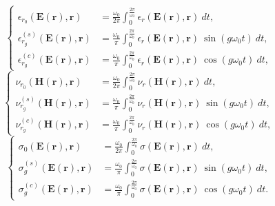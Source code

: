 \begin{equation}
\left\{
\begin{aligned} \label{eq:epsCoeffs}
{\epsilon}_{r_{0}}(\mathbf{E}(\mathbf{r}),\mathbf{r}) &= \frac{\omega_0}{2\pi}\int_0^{\frac{2\pi}{\omega_0}}
{\epsilon}_r(\mathbf{E}(\mathbf{r}),\mathbf{r}) \ dt, \\[.5cm]
{\epsilon}_{r_{g}}^{(s)}(\mathbf{E}(\mathbf{r}),\mathbf{r}) &=  \frac{\omega_0}{\pi}\int_0^{\frac{2\pi}{\omega_0}}
{\epsilon}_r(\mathbf{E}(\mathbf{r}),\mathbf{r}) \ \sin(g \omega_0 t) \ dt, \\[.5cm]
{\epsilon}_{r_{g}}^{(c)}(\mathbf{E}(\mathbf{r}),\mathbf{r}) &=  \frac{\omega_0}{\pi}\int_0^{\frac{2\pi}{\omega_0}} 
{\epsilon}_r(\mathbf{E}(\mathbf{r}),\mathbf{r}) \ \cos(g \omega_0 t) \ dt,
\end{aligned}
\right.
\end{equation}
\begin{equation}
\left\{
\begin{aligned} \label{eq:nuCoeffs}
{\nu}_{r_{0}}(\mathbf{H}(\mathbf{r}),\mathbf{r}) &=  \frac{\omega_0}{2\pi}\int_0^{\frac{2\pi}{\omega_0}}
{\nu}_r(\mathbf{H}(\mathbf{r}),\mathbf{r}) \ dt, \\
{\nu}_{r_{g}}^{(s)}(\mathbf{H}(\mathbf{r}),\mathbf{r}) &=  \frac{\omega_0}{\pi}\int_0^{\frac{2\pi}{\omega_0}}
{\nu}_r(\mathbf{H}(\mathbf{r}),\mathbf{r}) \ \sin(g \omega_0 t) \ dt, \\ 
{\nu}_{r_{g}}^{(c)}(\mathbf{H}(\mathbf{r}),\mathbf{r}) &=  \frac{\omega_0}{\pi}\int_0^{\frac{2\pi}{\omega_0}} 
{\nu}_r(\mathbf{H}(\mathbf{r}),\mathbf{r}) \ \cos(g \omega_0 t) \ dt, 
\end{aligned}
\right.
\end{equation}
\begin{equation}
\left\{
\begin{aligned} \label{eq:sigCoeffs}
{\sigma}_{0}(\mathbf{E}(\mathbf{r}),\mathbf{r}) &=  \frac{\omega_0}{2\pi}\int_0^{\frac{2\pi}{\omega_0}}
{\sigma}(\mathbf{E}(\mathbf{r}),\mathbf{r}) \ dt, \\
{\sigma}_{{g}}^{(s)}(\mathbf{E}(\mathbf{r}),\mathbf{r}) &=  \frac{\omega_0}{\pi}\int_0^{\frac{2\pi}{\omega_0}}
{\sigma}(\mathbf{E}(\mathbf{r}),\mathbf{r}) \ \sin(g \omega_0 t) \ dt, \\ 
{\sigma}_{{g}}^{(c)}(\mathbf{E}(\mathbf{r}),\mathbf{r}) &=  \frac{\omega_0}{\pi}\int_0^{\frac{2\pi}{\omega_0}} 
{\sigma}(\mathbf{E}(\mathbf{r}),\mathbf{r}) \ \cos(g \omega_0 t) \ dt.
\end{aligned}
\right.
\end{equation}

